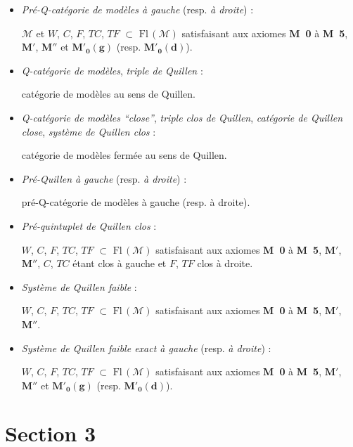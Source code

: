 \documentclass[11pt]{article}
\newcommand{\Fl}{\mathrm{Fl}\,}
\newcommand{\Mo}{\mathcal{M}}
\newcommand{\Mzg}{$\mathbf{M}'_{\mathbf{0}}\mathbf{(g)}$}
\newcommand{\Mzd}{$\mathbf{M}'_{\mathbf{0}}\mathbf{(d)}$}
\begin{document}
\begin{itemize}
\item[\textbullet] \textit{Pré-Q-catégorie de modèles à gauche} (resp. \textit{à droite}) :

$\Mo$ et $W$, $C$, $F$, $TC$, $TF$ $\subset$ $\Fl(\Mo)$ satisfaisant aux axiomes \textbf{M~0} à \textbf{M~5}, $\mathbf{M}'$, $\mathbf{M}''$ et \Mzg{} (resp. \Mzd).

\item[\textbullet] \textit{Q-catégorie de modèles}, \textit{triple de Quillen} :

catégorie de modèles au sens de Quillen.

\item[\textbullet] \textit{Q-catégorie de modèles “close”}, \textit{triple clos de Quillen}, \textit{catégorie de Quillen close}, \textit{système de Quillen clos} :

catégorie de modèles fermée au sens de Quillen.

\item[\textbullet] \textit{Pré-Quillen à gauche} (resp. \textit{à droite}) :

pré-Q-catégorie de modèles à gauche (resp. à droite).

\item[\textbullet] \textit{Pré-quintuplet de Quillen clos} :

$W$, $C$, $F$, $TC$, $TF$ $\subset$ $\Fl(\Mo)$ satisfaisant aux axiomes \textbf{M~0} à \textbf{M~5}, $\mathbf{M}'$, $\mathbf{M}''$, $C$, $TC$ étant clos à gauche et $F$, $TF$ clos à droite.

\item[\textbullet] \textit{Système de Quillen faible} :

$W$, $C$, $F$, $TC$, $TF$ $\subset$ $\Fl(\Mo)$ satisfaisant aux axiomes \textbf{M~0} à \textbf{M~5}, $\mathbf{M}'$, $\mathbf{M}''$.

\item[\textbullet] \textit{Système de Quillen faible exact à gauche} (resp. \textit{à droite}) :

$W$, $C$, $F$, $TC$, $TF$ $\subset$ $\Fl(\Mo)$ satisfaisant aux axiomes \textbf{M~0} à \textbf{M~5}, $\mathbf{M}'$, $\mathbf{M}''$ et \Mzg{} (resp. \Mzd).
\end{itemize}

\section*{Section 3}
\end{document}

